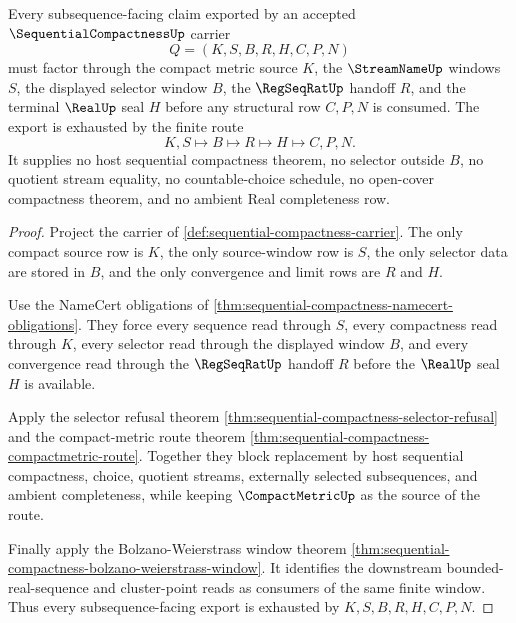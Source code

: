 \begin{theorem}
\label{thm:sequential-compactness-finite-window-exhaustion}
Every subsequence-facing claim exported by an accepted $\SequentialCompactnessUp$ carrier
$$
Q=(K,S,B,R,H,C,P,N)
$$
must factor through the compact metric source $K$, the $\StreamNameUp$ windows $S$, the displayed selector window $B$, the $\RegSeqRatUp$ handoff $R$, and the terminal $\RealUp$ seal $H$ before any structural row $C,P,N$ is consumed. The export is exhausted by the finite route
$$
K,S \longmapsto B \longmapsto R \longmapsto H \longmapsto C,P,N .
$$
It supplies no host sequential compactness theorem, no selector outside $B$, no quotient stream equality, no countable-choice schedule, no open-cover compactness theorem, and no ambient Real completeness row.
\end{theorem}
\begin{proof}
Project the carrier of \autoref{def:sequential-compactness-carrier}. The only compact source row is $K$, the only source-window row is $S$, the only selector data are stored in $B$, and the only convergence and limit rows are $R$ and $H$.

Use the NameCert obligations of \autoref{thm:sequential-compactness-namecert-obligations}. They force every sequence read through $S$, every compactness read through $K$, every selector read through the displayed window $B$, and every convergence read through the $\RegSeqRatUp$ handoff $R$ before the $\RealUp$ seal $H$ is available.

Apply the selector refusal theorem \autoref{thm:sequential-compactness-selector-refusal} and the compact-metric route theorem \autoref{thm:sequential-compactness-compactmetric-route}. Together they block replacement by host sequential compactness, choice, quotient streams, externally selected subsequences, and ambient completeness, while keeping $\CompactMetricUp$ as the source of the route.

Finally apply the Bolzano-Weierstrass window theorem \autoref{thm:sequential-compactness-bolzano-weierstrass-window}. It identifies the downstream bounded-real-sequence and cluster-point reads as consumers of the same finite window. Thus every subsequence-facing export is exhausted by $K,S,B,R,H,C,P,N$.
\end{proof}


